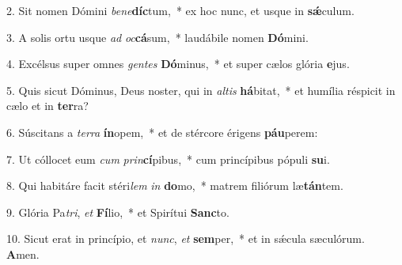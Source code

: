 2. Sit nomen Dómini \textit{be}\textit{ne}\textbf{díc}tum,~*  ex hoc nunc, et usque in \textbf{sǽ}culum.\

3. A solis ortu usque \textit{ad} \textit{oc}\textbf{cá}sum,~*  laudábile nomen \textbf{Dó}mini.\

4. Excélsus super omnes \textit{gen}\textit{tes} \textbf{Dó}minus,~*  et super cælos glória \textbf{e}jus.\

5. Quis sicut Dóminus, Deus noster, qui in \textit{al}\textit{tis} \textbf{há}bitat,~*  et humília réspicit in cælo et in \textbf{ter}ra?\

6. Súscitans a \textit{ter}\textit{ra} \textbf{ín}opem,~*  et de stércore érigens \textbf{páu}perem:\

7. Ut cóllocet eum \textit{cum} \textit{prin}\textbf{cí}pibus,~*  cum princípibus pópuli \textbf{su}i.\

8. Qui habitáre facit stéri\textit{lem} \textit{in} \textbf{do}mo,~*  matrem filiórum læ\textbf{tán}tem.\

9. Glória Pa\textit{tri}, \textit{et} \textbf{Fí}lio,~*  et Spirítui \textbf{Sanc}to.\

10. Sicut erat in princípio, et \textit{nunc}, \textit{et} \textbf{sem}per,~*  et in sǽcula sæculórum. \textbf{A}men.\

